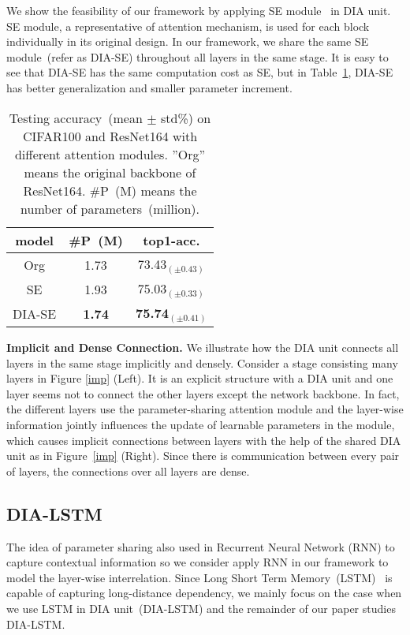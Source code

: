 \documentclass[letterpaper]{article} \usepackage{aaai20}  \usepackage{times}  \usepackage{helvet} \usepackage{courier}  \usepackage[hyphens]{url}  \usepackage{graphicx} \urlstyle{rm} \def\UrlFont{\rm}  \usepackage{graphicx}  \frenchspacing  \setlength{\pdfpagewidth}{8.5in}  \setlength{\pdfpageheight}{11in}  \usepackage{color}
\begin{document}
We show the feasibility of our framework by applying SE module~\cite{hu2018squeeze} in DIA unit. SE module, a representative of attention mechanism, is used for each block individually in its original design. In our framework, we share the same SE module~(refer as DIA-SE) throughout all layers in the same stage. It is easy to see that DIA-SE has the same computation cost as SE, but in Table~\ref{tab:share}, DIA-SE has better generalization and smaller parameter increment.

\begin{table}[htbp]
  \centering
    \begin{tabular}{|c|c|c|}
    \toprule
       model   & \#P~(M) & top1-acc. \\
    \midrule
    Org   & 1.73  & 73.43$_{(\pm0.43)}$ \\
    SE    & 1.93  & 75.03$_{(\pm0.33)}$ \\
    DIA-SE & \textbf{1.74}  & \textbf{75.74}$_{(\pm0.41)}$ \\
    \bottomrule
    \end{tabular}\caption{Testing accuracy~(mean $\pm$ std\%) on CIFAR100 and ResNet164 with different attention modules. ''Org'' means the original backbone of ResNet164. \#P~(M) means the number of parameters~(million).}
      \label{tab:share}\end{table}

	 \textbf{Implicit and Dense Connection.} We illustrate how the DIA unit connects all layers in the same stage implicitly and densely. Consider a stage consisting many layers in Figure \ref{imp} (Left). It is an explicit structure with a DIA unit and one layer seems not to connect the other layers except the network backbone. In fact, the different layers use the parameter-sharing attention module and the layer-wise information jointly influences the update of learnable parameters in the module, which causes implicit connections between layers with the help of the shared DIA unit as in Figure~\ref{imp} (Right). Since there is communication between every pair of layers, the connections over all layers are dense.
	 
	\subsection{DIA-LSTM} 
	The idea of parameter sharing also used in Recurrent Neural Network (RNN) to capture contextual information so we consider apply RNN in our framework to model the layer-wise interrelation. Since Long Short Term Memory~(LSTM)~\cite{hochreiter1997long} is capable of capturing long-distance dependency, we mainly focus on the case when we use LSTM in DIA unit~(DIA-LSTM) and the remainder of our paper studies DIA-LSTM.
	
\end{document}
